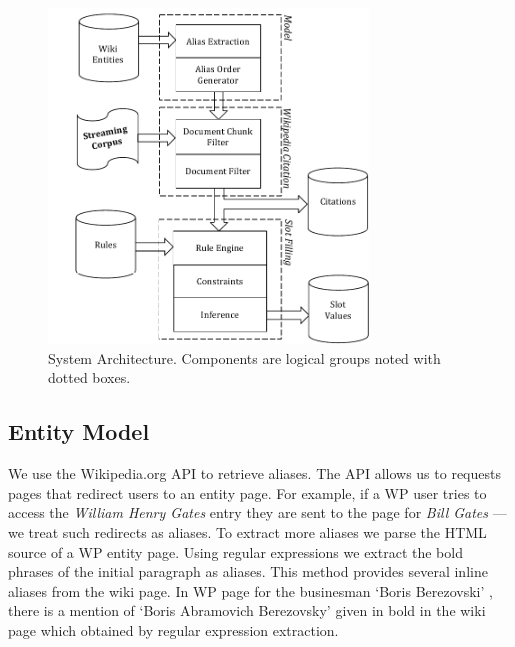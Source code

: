 \documentclass[letterpaper]{article}
\begin{document}
\begin{figure}
\hspace{-10mm}
  \centering
  \includegraphics[width=8.5cm]{./images/System_Diagram_with_model_Vertical-crop.pdf}
  \vspace*{-.1in} 
  \caption{System Architecture.
  Components are logical groups noted with dotted boxes.}
  \label{fig:system}
  \vspace*{-.2in}
\end{figure}



\subsection{Entity Model}
\label{sec:entitymodel}

We use the Wikipedia.org API to retrieve aliases. 
The API allows us to requests pages that redirect users to an entity page.
For example, if a WP user tries to access the \textsl{William Henry Gates} entry they are sent to the page for 
\textsl{Bill Gates} --- we treat  such redirects as aliases. 
To extract more aliases we parse the HTML source of a WP entity page.
Using regular expressions we extract the bold phrases of the initial paragraph as aliases.
This method provides several inline aliases from the wiki page.
In WP page for the businesman `Boris Berezovski' , there is a mention of `Boris Abramovich Berezovsky' given in bold in the wiki page which obtained by regular expression extraction.

\end{document}
